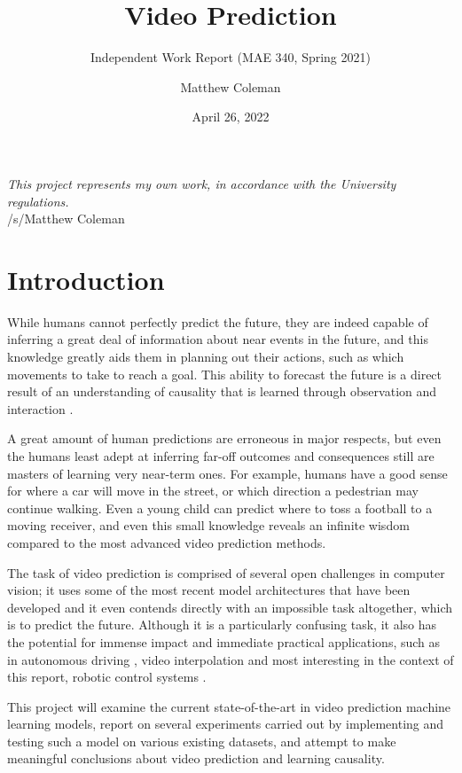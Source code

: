 \documentclass{scrartcl}
\title{Video Prediction}
\subtitle{Independent Work Report (MAE 340, Spring 2021)}
\author{Matthew Coleman}
\date{April 26, 2022}
\begin{document}
\maketitle

\vspace{8cm}
\Large
\textit{This project represents my own work, in accordance with the University regulations.} \\
\hspace*{\fill} \large /s/Matthew Coleman
\normalsize

\newpage
\tableofcontents
\newpage

\section{Introduction}
\label{sec:intro}

While humans cannot perfectly predict the future, they are indeed capable of
inferring a great deal of information about near events in the future, and this
knowledge greatly aids them in planning out their actions, such as which
movements to take to reach a goal. This ability to forecast the future is a
direct result of an understanding of causality that is learned through
observation and interaction \cite{human_learning_sequences}.

A great amount of human predictions are erroneous in major respects, but even
the humans least adept at inferring far-off outcomes and consequences still are
masters of learning very near-term ones. For example, humans have a good sense
for where a car will move in the street, or which direction a pedestrian may
continue walking. Even a young child can predict where to toss a football to a
moving receiver, and even this small knowledge reveals an infinite wisdom
compared to the most advanced video prediction methods.

The task of video prediction is comprised of several open challenges in
computer vision; it uses some of the most recent model architectures that have
been developed and it even contends directly with an impossible task
altogether, which is to predict the future. Although it is a particularly
confusing task, it also has the potential for immense impact and immediate
practical applications, such as in autonomous driving \cite{eg_self_driving},
video interpolation \cite{eg_video_interp} and most interesting in the context
of this report, robotic control systems \cite{eg_robot_control}.

This project will examine the current state-of-the-art in video prediction
machine learning models, report on several experiments carried out by
implementing and testing such a model on various existing datasets, and attempt
to make meaningful conclusions about video prediction and learning causality.
\end{document}
